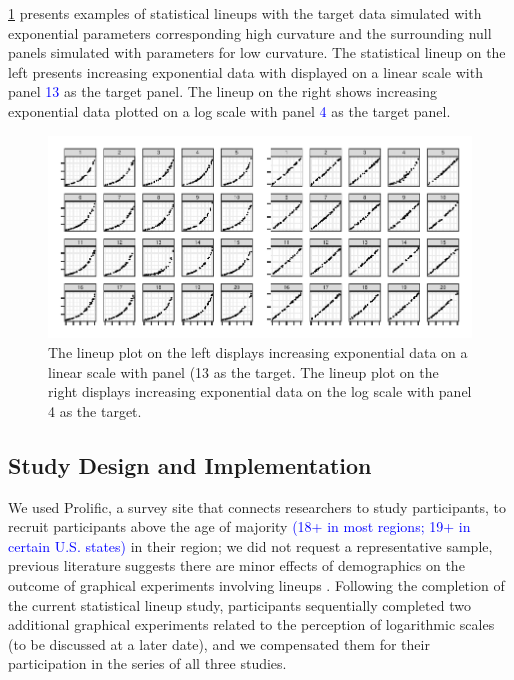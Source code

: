 \documentclass[12pt]{article}
\begin{document}
\cref{fig:lineup-example} presents examples of statistical lineups with
the target data simulated with exponential parameters corresponding high
curvature and the surrounding null panels simulated with parameters for
low curvature. The statistical lineup on the left presents increasing
exponential data with displayed on a linear scale with panel
{\textcolor{blue}{13}} as the target panel. The lineup on the right
shows increasing exponential data plotted on a log scale with panel
{\textcolor{blue}{4}} as the target panel.

\begin{figure}[tbp]

{\centering \includegraphics[width=\linewidth,]{logarithmic-lineups-revisions_files/figure-latex/lineup-example-1} 

}

\caption{The lineup plot on the left displays increasing exponential data on a linear scale with panel (13 as the target. The lineup plot on the right displays increasing exponential data on the log scale with panel 4 as the target.}\label{fig:lineup-example}
\end{figure}

\hypertarget{study-design-and-implementation}{%
\subsection{Study Design and
Implementation}\label{study-design-and-implementation}}

We used Prolific, a survey site that connects researchers to study
participants, to recruit participants above the age of majority
{\textcolor{blue}{(18+ in most regions; 19+ in certain U.S. states)}} in
their region; we did not request a representative sample, previous
literature suggests there are minor effects of demographics on the
outcome of graphical experiments involving lineups
\citep{vanderplas2015spatial, majumder_validation_2013}. Following the
completion of the current statistical lineup study, participants
sequentially completed two additional graphical experiments related to
the perception of logarithmic scales (to be discussed at a later date),
and we compensated them for their participation in the series of all
three studies.
\end{document}

